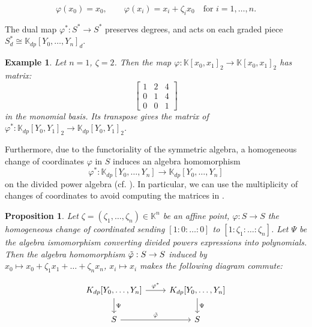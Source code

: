 \documentclass[a4paper,11p]{amsart}
\newtheorem{prop0}[defn0]{Proposition}
\newtheorem{example0}[defn0]{Example}
\newenvironment{proposition}{\bigskip \begin{prop0}}{\end{prop0}}
\newenvironment{example}{ \begin{example0}\rm}{\end{example0}}
\newcommand{\K}{\mathbb K}
\begin{document}
\begin{equation}\label{change:of:coordinates}
\varphi(x_0) = x_0, \qquad \varphi(x_i) = x_i + \zeta_i x_0 \quad \text{for } i = 1, \ldots, n.
\end{equation}

The dual map $ \varphi^*: S^* \to S^* $ preserves degrees, and acts on each graded piece $ S_d^* \cong \K_{dp}[Y_0,\ldots,Y_n]_d $.


\begin{example}\label{example: DualChangeCoord}
Let $ n = 1 $, $ \zeta = 2 $. Then the map $ \varphi: \K[x_0,x_1]_2 \to \K[x_0,x_1]_2 $ has matrix:
\[
\begin{bmatrix}
1 & 2 & 4 \\
0 & 1 & 4 \\
0 & 0 & 1
\end{bmatrix}
\]
in the monomial basis. Its transpose gives the matrix of $ \varphi^*: \K_{dp}[Y_0,Y_1]_2 \to \K_{dp}[Y_0,Y_1]_2 $.
\end{example}




Furthermore, due to the functoriality of the symmetric algebra, a homogeneous change of coordinates $\varphi$ in $S$ induces an algebra homomorphism 
\begin{equation}\label{prop: DualChangeIsAlgebraHom}
    \varphi^*: \mathbb{K}_{dp}[Y_0,\ldots,Y_n] \to \mathbb{K}_{dp}[Y_0,\ldots,Y_n]
    \end{equation}
on the divided power algebra (cf. \cite[Chap. III, \S11.5]{Bourbaki}). In particular, we can use the multiplicity of changes of coordinates to avoid computing the matrices in .
\begin{proposition}\label{prop: ChangeCoordInDivPowers}
    Let $\zeta=(\zeta_1,\ldots, \zeta_n)\in \mathbb K^n$ be an affine point, $\varphi:S\to S$ the homogeneous change of coordinated sending $[1:0:\ldots :0]$ to $[1:\zeta_1:\ldots : \zeta_n]$. Let $\Psi$ be the algebra ismomorphism converting divided powers expressions into polynomials. Then the algebra homomorphism $\Tilde{\varphi}:S\to S$ induced by $x_0\mapsto x_0+\zeta_1x_1+\ldots + \zeta_n x_n$, $x_i\mapsto x_i$ makes the following diagram commute:

\[\begin{tikzcd}
	{K_{dp}[Y_0,\ldots, Y_n]} & {K_{dp}[Y_0,\ldots, Y_n]} \\
	S & S
	\arrow["{\varphi^*}", from=1-1, to=1-2]
	\arrow["\Psi", from=1-1, to=2-1]
	\arrow["\Psi", from=1-2, to=2-2]
	\arrow["{\Tilde{\varphi}}", from=2-1, to=2-2]
\end{tikzcd}\]    
\end{proposition}
\end{document}
